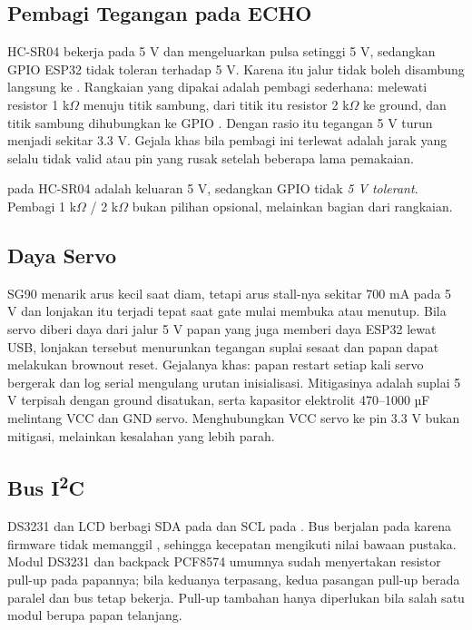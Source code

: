 \subsection{Pembagi Tegangan pada ECHO}

HC-SR04 bekerja pada 5 V dan mengeluarkan pulsa  setinggi 5 V, sedangkan
GPIO ESP32 tidak toleran terhadap 5 V. Karena itu jalur  tidak boleh
disambung langsung ke \PinEcho. Rangkaian yang dipakai adalah pembagi sederhana:
 melewati resistor 1 k$\Omega$ menuju titik sambung, dari titik itu
resistor 2 k$\Omega$ ke ground, dan titik sambung dihubungkan ke GPIO \PinEcho.
Dengan rasio itu tegangan 5 V turun menjadi sekitar 3.3 V. Gejala khas bila pembagi
ini terlewat adalah jarak yang selalu tidak valid atau pin yang rusak setelah
beberapa lama pemakaian.

\begin{warnbox}
 pada HC-SR04 adalah keluaran 5 V, sedangkan GPIO \PinEcho{} tidak
\emph{5 V tolerant}. Pembagi 1 k$\Omega$ / 2 k$\Omega$ bukan pilihan opsional,
melainkan bagian dari rangkaian.
\end{warnbox}

\subsection{Daya Servo}

SG90 menarik arus kecil saat diam, tetapi arus stall-nya sekitar 700 mA pada 5 V dan
lonjakan itu terjadi tepat saat gate mulai membuka atau menutup. Bila servo diberi
daya dari jalur 5 V papan yang juga memberi daya ESP32 lewat USB, lonjakan tersebut
menurunkan tegangan suplai sesaat dan papan dapat melakukan brownout reset. Gejalanya
khas: papan restart setiap kali servo bergerak dan log serial mengulang urutan
inisialisasi. Mitigasinya adalah suplai 5 V terpisah dengan ground disatukan, serta
kapasitor elektrolit 470--1000 µF melintang VCC dan GND servo. Menghubungkan VCC
servo ke pin 3.3 V bukan mitigasi, melainkan kesalahan yang lebih parah.

\subsection{Bus I\textsuperscript{2}C}

DS3231 dan LCD berbagi SDA pada \PinSda{} dan SCL pada \PinScl. Bus berjalan pada
\IicClock{} karena firmware tidak memanggil , sehingga
kecepatan mengikuti nilai bawaan pustaka. Modul DS3231 dan backpack PCF8574 umumnya
sudah menyertakan resistor pull-up pada papannya; bila keduanya terpasang, kedua
pasangan pull-up berada paralel dan bus tetap bekerja. Pull-up tambahan hanya
diperlukan bila salah satu modul berupa papan telanjang.

